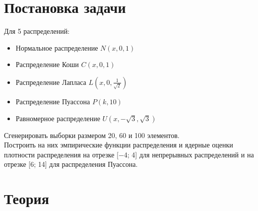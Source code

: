 
\usepackage{amsmath}




\renewcommand\contentsname{\centerline{Содержание}}
\tableofcontents
\newpage

\listoffigures
\newpage

\listoftables
\newpage

\section{Постановка задачи}
Для 5 распределений:
\begin{itemize}
\item Нормальное распределение  \(N(x, 0, 1)\)
\item Распределение Коши  \(C(x, 0, 1)\)
\item Распределение Лапласа  \(L(x, 0, \frac{1}{\sqrt{2}})\)
\item Распределение Пуассона  \(P(k, 10)\)
\item Равномерное распределение  \(U(x, -\sqrt{3}, \sqrt{3})\)
\end{itemize}
Сгенерировать выборки размером 20, 60 и 100 элементов. \\
Построить на них эмпирические функции распределения и ядерные
оценки плотности распределения на отрезке [−4; 4] для непрерывных
распределений и на отрезке [6; 14] для распределения Пуассона.

\section{Теория}
